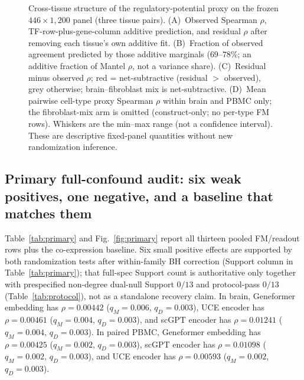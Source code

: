 \documentclass[fleqn,10pt,lineno]{wlpeerj}
\newcommand{\fitfig}[1]{\resizebox{\ifdim\width>\linewidth\linewidth\else\width\fi}{!}{#1}}
\begin{document}
\begin{figure}[!tbp]\centering
\fitfig{}
\caption{Cross-tissue structure of the regulatory-potential proxy on the frozen
$446\times 1{,}200$ panel (three tissue pairs). (A)~Observed Spearman $\rho$,
TF-row-plus-gene-column additive prediction, and residual $\rho$ after removing
each tissue's own additive fit. (B)~Fraction of observed agreement predicted by
those additive marginals ($69$--$78\%$; an additive fraction of Mantel $\rho$, not a variance
share). (C)~Residual minus observed $\rho$;
red = net-subtractive (residual $>$ observed), grey otherwise; brain--fibroblast
mix is net-subtractive. (D)~Mean pairwise cell-type proxy Spearman $\rho$ within
brain and PBMC only; the fibroblast-mix arm is omitted (construct-only; no per-type FM rows).
Whiskers are the min--max range (not a confidence interval).
These are descriptive fixed-panel quantities without new randomization inference.}\label{fig:decomp}
\end{figure}
\FloatBarrier

\begin{table}[H]\centering
\fitfig{}
\caption{Observed cross-tissue reproducibility of the regulatory-potential proxy on the frozen
$446\times 1{,}200$ panel ($n=3$ tissue pairs). Columns: observed Spearman $\rho_{\mathrm{Mantel}}$; additive
fraction of that agreement from TF-row plus gene-column marginals; residual Spearman $\rho_{\mathrm{resid}}$ after each
tissue's own additive fit; nonzero-edge $\varphi$ (phi coefficient of nonzero-edge
presence/absence); edge Jaccard; mean per-TF-row Spearman; shared TF count ($446$). Fixed-panel
descriptive quantities; no confidence interval or new randomization inference.}
\label{tab:cross}
\end{table}
\FloatBarrier

\subsection{Primary full-confound audit: six weak positives, one negative, and a baseline that
matches them}
Table~\ref{tab:primary} and Fig.~\ref{fig:primary} report all thirteen pooled FM/readout rows plus
the co-expression baseline. Six small positive effects are supported by both randomization tests
after within-family BH correction (Support column in Table~\ref{tab:primary}); that full-spec Support
count is authoritative only together with prespecified non-degree dual-null Support $0/13$ and
protocol-pass $0/13$ (Table~\ref{tab:protocol}), not as a standalone recovery claim. In brain,
Geneformer embedding has $\rho=0.00442$
($q_M=0.006$, $q_D=0.003$), UCE encoder has $\rho=0.00461$ ($q_M=0.004$, $q_D=0.003$), and scGPT
encoder has $\rho=0.01241$ ($q_M=0.004$, $q_D=0.003$). In paired PBMC, Geneformer embedding has
$\rho=0.00425$ ($q_M=0.002$, $q_D=0.003$), scGPT encoder has $\rho=0.01098$ ($q_M=0.002$,
$q_D=0.003$), and UCE encoder has $\rho=0.00593$ ($q_M=0.002$, $q_D=0.003$).
\end{document}
